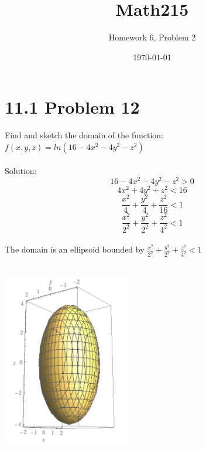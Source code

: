 \documentclass{article} %
\title{Math215} %
\author{Homework 6, Problem 2} %
\date{\today}
\begin{document}
\maketitle %
\section*{11.1 Problem 12} %
Find and sketch the domain of the function: $f(x,y,z) = ln(16 - 4x^2 - 4y^2 - z^2)$
\\\\Solution:
\begin{equation*}
  16 - 4x^2 - 4y^2 - z^2 > 0
\end{equation*}
\begin{equation*}
  4x^2 + 4y^2 + z^2 < 16
\end{equation*}
\begin{equation*}
  \frac{x^2}{4} + \frac{y^2}{4} + \frac{z^2}{16} < 1
\end{equation*}
\begin{equation*}
  \frac{x^2}{2^2} + \frac{y^2}{2^2} + \frac{z^2}{4^2} < 1
\end{equation*}
\\The domain is an ellipsoid bounded by $\frac{x^2}{2^2} + \frac{y^2}{2^2} + \frac{z^2}{4^2} < 1$
\\ 
\\
\begin{center}
  \includegraphics[height=3in]{graph.png}
\end{center}
  
\end{document}
